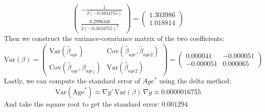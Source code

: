 \documentclass[12pt]{article}
\begin{document}
\begin{flushleft}
\[\begin{pmatrix}
-\frac{1}{2(-0.3834755)} \\
\frac{0.2996346}{2(-0.3834755)^2}
\end{pmatrix}
=
\begin{pmatrix}
    1.303986\\
    1.018814
\end{pmatrix}
\]
Then we construct the variance-covariance matrix of the two coefficients:
\[
\text{Var}(\beta) =
\begin{pmatrix}
\text{Var}(\hat{\beta}_{age}) & \text{Cov}(\hat{\beta}_{age}, \hat{\beta}_{age2}) \\
\text{Cov}(\hat{\beta}_{age}, \hat{\beta}_{age_2}) & \text{Var}(\hat{\beta}_{age2})
\end{pmatrix}
=
\begin{pmatrix}
    0.000041 & -0.000051\\
    -0.000051 & 0.000065
\end{pmatrix}
\]
Lastly, we can compute the standard error of $Age^*$ using the delta method:
\[
\text{Var}(\text{Age}^*) \approx \nabla g' \, \text{Var}(\beta) \, \nabla g \approx 0.0000016755
\]
And take the square root to get the standard error: $0.001294$
\end{flushleft}
\end{document}
